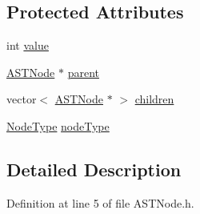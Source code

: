 \subsection*{Protected Attributes}
\begin{DoxyCompactItemize}
\item 
int \hyperlink{class_a_s_t_node_a136d1712e8cfdeb4908aceb22abc3de7}{value}
\item 
\hyperlink{class_a_s_t_node}{A\-S\-T\-Node} $\ast$ \hyperlink{class_a_s_t_node_aaa1e479bfeb485d93a4866f9c2daf171}{parent}
\item 
vector$<$ \hyperlink{class_a_s_t_node}{A\-S\-T\-Node} $\ast$ $>$ \hyperlink{class_a_s_t_node_af8f4491cf9294805337542d5873c85b2}{children}
\item 
\hyperlink{class_a_s_t_node_a4fd016b5f0e44ea6aca3542d27de3859}{Node\-Type} \hyperlink{class_a_s_t_node_a15fcdbd8403a1169b06d948a827fde55}{node\-Type}
\end{DoxyCompactItemize}


\subsection{Detailed Description}


Definition at line 5 of file A\-S\-T\-Node.\-h.



